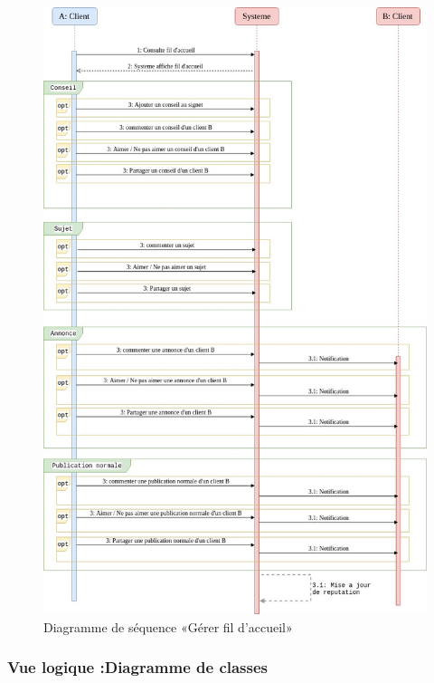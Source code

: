 \documentclass[11pt,a4paper,oneside]{book}
\begin{document}
					\begin{figure}[H]
						\centering
						\includegraphics[width=1.1\textwidth]{"Images/ch3/latestsequence"}
						\caption{Diagramme de séquence «Gérer fil d'accueil»}
						\label{fig:gestion-fil-daccueil}
					\end{figure}
				
				
				
					\subsubsection{Vue logique :Diagramme de classes}
					
\end{document}
